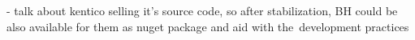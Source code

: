 \documentclass[
  digital, %
  table,   %
  lof,     %
  lot,     %
  oneside,
]{fithesis3}
\begin{document}
- talk about kentico selling it's source code, so after stabilization, BH could be also available for them as nuget package and aid with the~development practices 
%
%
%
%
%
%

	\makeatletter\thesis@blocks@clear\makeatother

	\printindex
    
  \printbibliography
\end{document}
